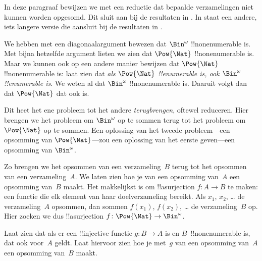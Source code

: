 \documentclass[../../../include/open-logic-section]{subfiles}
\begin{document}


\begin{editorial}
  In deze paragraaf bewijzen we met een reductie dat bepaalde
  verzamelingen niet kunnen worden opgesomd. Dit sluit aan bij de resultaten in
  . In  staat een andere, iets
  langere versie die aansluit bij de resultaten in
  .
\end{editorial}

We hebben met een diagonaalargument bewezen dat $\Bin^\omega$
!!{nonenumerable} is. Met bijna hetzelfde argument lieten we zien dat
$\Pow{\Nat}$ !!{nonenumerable} is. Maar we kunnen ook op een andere
manier bewijzen dat $\Pow{\Nat}$ !!{nonenumerable} is: laat zien dat
\emph{als $\Pow{\Nat}$ !!{enumerable} is, ook $\Bin^\omega$
!!{enumerable} is}. We weten al dat $\Bin^\omega$
!!{nonenumerable} is. Daaruit volgt dan dat $\Pow{\Nat}$ dat ook is.

Dit heet het ene probleem tot het andere \emph{terugbrengen}, oftewel
reduceren. Hier brengen we het probleem om $\Bin^\omega$ op te sommen
terug tot het probleem om $\Pow{\Nat}$ op te sommen. Een oplossing van
het tweede probleem---een opsomming van $\Pow{\Nat}$---zou een
oplossing van het eerste geven---een opsomming van $\Bin^\omega$.

Zo brengen we het opsommen van een verzameling~$B$ terug tot het
opsommen van een verzameling~$A$. We laten zien hoe je van een
opsomming van~$A$ een opsomming van~$B$ maakt. Het makkelijkst is om
!!a{surjection} $f\colon A \to B$ te maken: een functie die elk element
van haar doelverzameling bereikt. Als $x_1$, $x_2$, \dots{} de
verzameling~$A$ opsommen, dan sommen $f(x_1)$, $f(x_2)$, \dots{} de
verzameling~$B$ op. Hier zoeken we dus !!a{surjection} $f\colon
\Pow{\Nat} \to \Bin^\omega$.

\begin{prob}
Laat zien dat als er een !!{injective} functie $g\colon B \to A$ is
en $B$~!!{nonenumerable} is, dat ook voor~$A$ geldt. Laat hiervoor
zien hoe je met~$g$ van een opsomming van~$A$ een opsomming van~$B$
maakt.
\end{prob}
\end{document}
